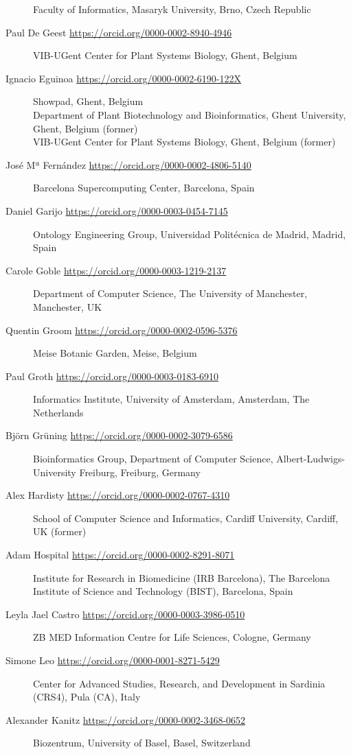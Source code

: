 \begin{flushleft}
\begin{description}
Faculty of Informatics, Masaryk University, Brno, Czech Republic
\item[Paul De Geest \url{https://orcid.org/0000-0002-8940-4946}]
VIB-UGent Center for Plant Systems Biology, Ghent, Belgium
\item[Ignacio Eguinoa \url{https://orcid.org/0000-0002-6190-122X}]
Showpad, Ghent, Belgium\\
Department of Plant Biotechnology and Bioinformatics, Ghent University,
Ghent, Belgium (former)\\
VIB-UGent Center for Plant Systems Biology, Ghent, Belgium (former)
\item[José Mª Fernández \url{https://orcid.org/0000-0002-4806-5140}]
Barcelona Supercomputing Center, Barcelona, Spain
\item[Daniel Garijo \url{https://orcid.org/0000-0003-0454-7145}]
Ontology Engineering Group, Universidad Politécnica de Madrid, Madrid,
Spain
\item[Carole Goble \url{https://orcid.org/0000-0003-1219-2137}]
Department of Computer Science, The University of Manchester,
Manchester, UK
\item[Quentin Groom \url{https://orcid.org/0000-0002-0596-5376}]
Meise Botanic Garden, Meise, Belgium
\item[Paul Groth \url{https://orcid.org/0000-0003-0183-6910}]
Informatics Institute, University of Amsterdam, Amsterdam, The
Netherlands
\item[Björn Grüning \url{https://orcid.org/0000-0002-3079-6586}]
Bioinformatics Group, Department of Computer Science,
Albert-Ludwigs-University Freiburg, Freiburg, Germany
\item[Alex Hardisty \url{https://orcid.org/0000-0002-0767-4310}]
School of Computer Science and Informatics, Cardiff University, Cardiff,
UK (former)
\item[Adam Hospital \url{https://orcid.org/0000-0002-8291-8071}]
Institute for Research in Biomedicine (IRB Barcelona), The Barcelona
Institute of Science and Technology (BIST), Barcelona, Spain
\item[Leyla Jael Castro \url{https://orcid.org/0000-0003-3986-0510}]
ZB MED Information Centre for Life Sciences, Cologne, Germany
\item[Simone Leo \url{https://orcid.org/0000-0001-8271-5429}]
Center for Advanced Studies, Research, and Development in Sardinia
(CRS4), Pula (CA), Italy
\item[Alexander Kanitz \url{https://orcid.org/0000-0002-3468-0652}] 
Biozentrum, University of Basel, Basel, Switzerland

\end{description}
\end{flushleft}
